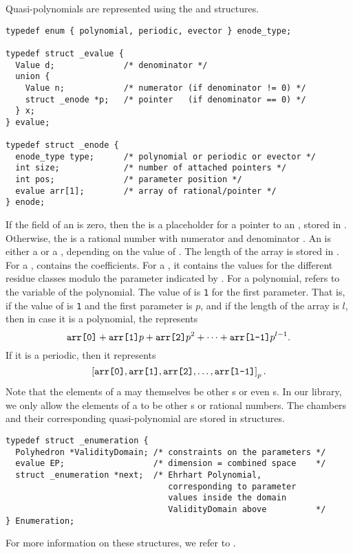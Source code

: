 Quasi-polynomials are represented using the 
 and  structures.
\begin{verbatim}
typedef enum { polynomial, periodic, evector } enode_type;

typedef struct _evalue {
  Value d;              /* denominator */
  union {
    Value n;            /* numerator (if denominator != 0) */
    struct _enode *p;   /* pointer   (if denominator == 0) */
  } x;
} evalue;

typedef struct _enode {
  enode_type type;      /* polynomial or periodic or evector */
  int size;             /* number of attached pointers */
  int pos;              /* parameter position */
  evalue arr[1];        /* array of rational/pointer */
} enode;
\end{verbatim}
If the field  of an  is zero, then
the  is a placeholder for a pointer to
an , stored in .
Otherwise, the  is a rational number with
numerator  and denominator .
An  is either a 
or a , depending on the value
of .
The length of the array  is stored in .
For a ,  contains the coefficients.
For a , it contains the values for the different
residue classes modulo the parameter indicated by .
For a polynomial,  refers to the variable
of the polynomial.
The value of  is \verb+1+ for the first parameter.
That is, if the value of  is \verb+1+ and the first
parameter is $p$, and if the length of the array is $l$,
then in case it is a polynomial, the
  represents
$$
\verb+arr[0]+ + \verb+arr[1]+ p + \verb+arr[2]+ p^2 + \cdots +
\verb+arr[l-1]+ p^{l-1}
.
$$
If it is a periodic, then it represents
$$
\left[
\verb+arr[0]+, \verb+arr[1]+,  \verb+arr[2]+, \ldots,
\verb+arr[l-1]+
\right]_p
.
$$
Note that the elements of a  may themselves
be other s or even s.
In our library, we only allow the elements of a  
to be other s or rational numbers.
The chambers and their corresponding quasi-polynomial are
stored in  structures.
\begin{verbatim}
typedef struct _enumeration {
  Polyhedron *ValidityDomain; /* constraints on the parameters */
  evalue EP;                  /* dimension = combined space    */
  struct _enumeration *next;  /* Ehrhart Polynomial,
                                 corresponding to parameter
                                 values inside the domain
                                 ValidityDomain above          */
} Enumeration;
\end{verbatim}
For more information on these structures, we refer to .

